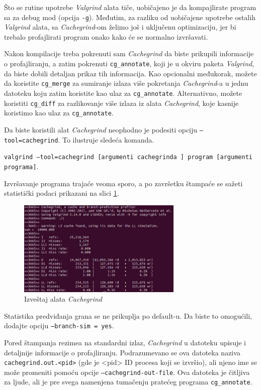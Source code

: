 \documentclass[12pt,oneside]{memoir}
\theoremstyle{plain}
\theoremstyle{definition}
\begin{document}
Što se rutine upotrebe \textit{Valgrind} alata tiče, uobičajeno je da kompajlirate program sa za debug mod (opcija \texttt{-g}). Međutim, za razliku od uobičajene upotrebe ostalih \textit{Valgrind} alata, sa \textit{Cachegrind}-om želimo još i uključenu optimizaciju, jer bi trebalo profajlirati program onako kako će se normalno izvršavati. 

Nakon kompilacije treba pokrenuti sam \textit{Cachegrind} da biste prikupili informacije o profajliranju, a zatim pokrenuti \texttt{cg\_annotate}, koji je u okviru paketa \textit{Valgrind}, da biste dobili detaljan prikaz tih informacija. Kao opcionalni međukorak, možete da koristite \texttt{cg\_merge} za sumiranje izlaza više pokretanja \textit{Cachegrind}-a u jednu datoteku koju zatim koristite kao ulaz za \texttt{cg\_annotate}. Alternativno, možete koristiti \texttt{cg\_diff} za razlikovanje više izlaza iz alata \textit{Cachegrind}, koje kasnije koristimo kao ulaz za \texttt{cg\_annotate}.

Da biste koristili alat \textit{Cachegrind} neophodno je podesiti opciju \texttt{–tool=cachegrind}. To ilustruje sledeća komanda. 
\begin{center}
\texttt{valgrind --tool=cachegrind [argumenti cachegrinda ] program [argumenti programa]}.
\end{center}

Izvršavanje programa trajaće veoma sporo, a po završetku štampaće se sažeti statistički podaci prikazani na slici \ref{fig:slika2.15}.
\begin{figure}[!ht]
  \centering
  \includegraphics[width=0.7\textwidth]{CachegrindReport.png}
  \caption{Izveštaj alata \textit{Cachegrind}}
  \label{fig:slika2.15}
\end{figure}
Statistika predviđanja grana se ne prikuplja po default-u. Da biste to omogućili, dodajte opciju \texttt{--branch-sim = yes}.

Pored štampanja rezimea na standardni izlaz, \textit{Cachegrind} u datoteku upisuje i detaljnije informacije o profajliranju. Podrazumevano se ova datoteka naziva \texttt{cachegrind.out.<pid>} (gde je <pid> ID procesa koji se izvršio), ali njeno ime se može promeniti pomoću opcije \texttt{--cachegrind-out-file}. Ova datoteka je čitljiva za ljude, ali je pre svega namenjena tumačenju pratećeg programa \texttt{cg\_annotate}.
\end{document}

